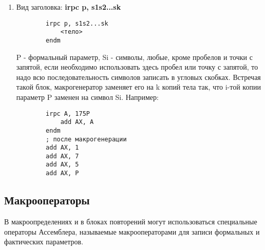 \begin{enumerate}
    \item Вид заголовка: \textbf{irpc p, s1s2...sk}
    \begin{verbatim}
        irpc p, s1s2...sk
            <тело>
        endm
    \end{verbatim}
    P - формальный параметр, Si - символы, любые, кроме пробелов и точки с запятой, если необходимо использовать здесь пробел или точку с запятой, то надо всю последовательность символов записать в угловых скобках. Встречая такой блок, макрогенератор заменяет его на k копий тела так, что i-той копии параметр P заменен на символ Si. Например:
    \begin{verbatim}
        irpc A, 175P
            add AX, A
        endm
        ; после макрогенерации
        add AX, 1
        add AX, 7
        add AX, 5
        add AX, P
    \end{verbatim}
\end{enumerate}

\subsection{Макрооператоры}

В макроопределениях и в блоках повторений могут использоваться специальные операторы Ассемблера, называемые макрооператорами для записи формальных и фактических параметров.

